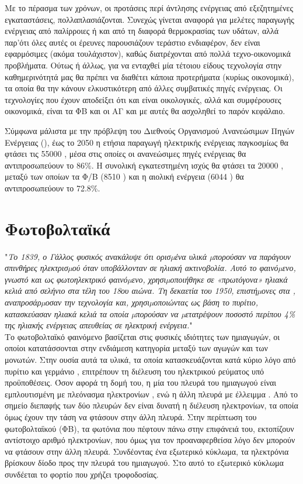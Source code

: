\documentclass[12pt]{report}
\begin{document}
Με το πέρασμα των χρόνων, οι προτάσεις περί άντλησης ενέργειας από εξεζητημένες εγκαταστάσεις, πολλαπλασιάζονται. Συνεχώς γίνεται αναφορά για μελέτες παραγωγής ενέργειας από παλίρροιες ή και από τη διαφορά θερμοκρασίας των υδάτων, 
αλλά παρ'ότι όλες αυτές οι έρευνες παρουσιάζουν τεράστιο ενδιαφέρον, δεν είναι εφαρμόσιμες (ακόμα τουλάχιστον), καθώς διατρέχονται από πολλά τεχνο-οικονομικά προβλήματα. Ούτως ή άλλως, για να ενταχθεί μία τέτοιου είδους τεχνολογία 
στην καθημερινότητά μας θα πρέπει να διαθέτει κάποια προτερήματα (κυρίως οικονομικά), τα οποία θα την κάνουν ελκυστικότερη από άλλες συμβατικές πηγές ενέργειας. Οι τεχνολογίες που έχουν αποδείξει ότι και είναι οικολογικές, αλλά και 
συμφέρουσες οικονομικά, είναι τα ΦΒ και οι ΑΓ και με αυτές θα ασχοληθεί το παρόν κεφάλαιο. 

Σύμφωνα μάλιστα με την πρόβλεψη του Διεθνούς Οργανισμού Ανανεώσιμων Πηγών Ενέργειας ({}), έως το 2050 η ετήσια παραγωγή ηλεκτρικής ενέργειας παγκοσμίως θα φτάσει τις 55000 {},
μέσα στις οποίες οι ανανεώσιμες πηγές ενέργειας θα αντιπροσωπεύουν το 86\%. Η συνολική εγκατεστημένη ισχύς θα φτάσει τα 20000 {}, μεταξύ των οποίων τα Φ/Β (8510 {}) και
η αιολική ενέργεια (6044 {}) θα αντιπροσωπεύουν το 72.8\%.
\pagebreak
\section{Φωτοβολταϊκά}
"{\textit{Το 1839, ο Γάλλος φυσικός {} ανακάλυψε ότι ορισµένα υλικά µπορούσαν να παράγουν σπινθήρες ηλεκτρισµού όταν υποβάλλονταν σε ηλιακή ακτινοβολία. Αυτό το φαινόµενο, γνωστό και ως φωτοηλεκτρικό
φαινόµενο, χρησιµοποιήθηκε σε «πρωτόγονα» ηλιακά κελιά από σελήνιο στα τέλη του 18ου αιώνα. Τη δεκαετία του 1950, επιστήµονες στα {}, αναπροσάρµοσαν την τεχνολογία και, χρησιµοποιώντας ως βάση το
πυρίτιο, κατασκεύασαν ηλιακά κελιά τα οποία µπορούσαν να µετατρέψουν ποσοστό περίπου 4\% της ηλιακής ενέργειας απευθείας σε ηλεκτρική ενέργεια.}}" \parencite{teetkm2011}
\\[10pt]
Το φωτοβολταϊκό φαινόμενο βασίζεται στις φυσικές ιδιότητες των ημιαγωγών, οι οποίοι κατατάσσονται στην ενδιάμεση κατηγορία μεταξύ των αγωγών και των μονωτών. Στην ουσία αυτά τα υλικά, τα οποία κατασκευάζονται κατά κύριο λόγο
από πυρίτιο {} και γερμάνιο {}, επιτρέπουν τη διέλευση του ηλεκτρικού ρεύματος υπό προϋποθέσεις. Όσον αφορά τη δομή του, η μία του πλευρά του ημιαγωγού είναι εμπλουτισμένη με πλεόνασμα ηλεκτρονίων 
{}, ενώ η άλλη πλευρά με έλλειμμα {}. Από το σημείο διεπαφής {} των δύο πλευρών δεν είναι δυνατή η διέλευση ηλεκτρονίων, τα οποία όμως έχουν την τάση να φτάσουν στην άλλη πλευρά.
Στην περίπτωση του φωτοβολταϊκού (ΦΒ), τα φωτόνια που πέφτουν πάνω στην επιφάνειά του, εκτοπίζουν αντίστοιχο αριθμό ηλεκτρονίων, που όμως για τον προαναφερθείσα λόγο δεν μπορούν να φτάσουν στην άλλη πλευρά. Συνδέοντας ένα εξωτερικό 
κύκλωμα, τα ηλεκτρόνια βρίσκουν δίοδο προς την {} πλευρά του ημιαγωγού. Στο αυτό το εξωτερικό κύκλωμα συνδέεται το φορτίο που χρήζει τροφοδοσίας.
\end{document}
